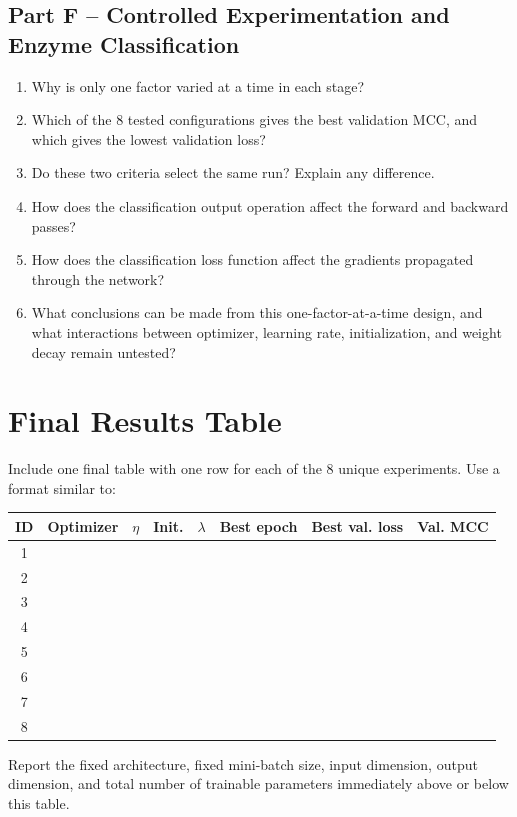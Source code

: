 \documentclass[11pt]{article}
\begin{document}
\subsection*{Part F -- Controlled Experimentation and Enzyme Classification}
\begin{enumerate}
    \item Why is only one factor varied at a time in each stage?
    \item Which of the 8 tested configurations gives the best validation MCC, and which gives the lowest validation loss?
    \item Do these two criteria select the same run? Explain any difference.
    \item How does the classification output operation affect the forward and backward passes?
    \item How does the classification loss function affect the gradients propagated through the network?
    \item What conclusions can be made from this one-factor-at-a-time design, and what interactions between optimizer, learning rate, initialization, and weight decay remain untested?
\end{enumerate}

\section{Final Results Table}
Include one final table with one row for each of the 8 unique experiments. Use a format similar to:

\begin{center}
\small
\begin{tabular}{cllllrrr}
\toprule
ID & Optimizer & $\eta$ & Init. & $\lambda$ & Best epoch & Best val. loss & Val. MCC \\
\midrule
1  & & & & & & & \\
2  & & & & & & & \\
3  & & & & & & & \\
4  & & & & & & & \\
5  & & & & & & & \\
6  & & & & & & & \\
7  & & & & & & & \\
8  & & & & & & & \\
\bottomrule
\end{tabular}
\end{center}

Report the fixed architecture, fixed mini-batch size, input dimension, output dimension, and total number of trainable parameters immediately above or below this table.
\end{document}
